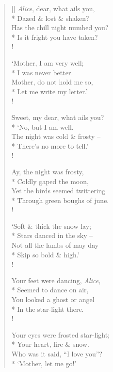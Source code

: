 \documentclass[MAIN]{subfiles}
\begin{document}
\settowidth{\versewidth}{\vin Is it fright you have taken?}
\begin{verse}[\versewidth]
\emph{Alice}, dear, what ails you,\\*
\vin Dazed \& lost \& shaken?\\
Has the chill night numbed you?\\*
\vin Is it fright you have taken?\\!

`Mother, I am very well;\\*
\vin I was never better.\\
Mother, do not hold me so,\\*
\vin Let me write my letter.'\\!

Sweet, my dear, what ails you?\\*
\vin `No, but I am well.\\
The night was cold \& frosty --\\*
\vin There's no more to tell.'\\!

Ay, the night was frosty,\\*
\vin Coldly gaped the moon,\\
Yet the birds seemed twittering\\*
\vin Through green boughs of june.\\!

`Soft \& thick the snow lay;\\*
\vin Stars danced in the sky --\\
Not all the lambs of may-day\\*
\vin Skip so bold \& high.'\\!

Your feet were dancing, \emph{Alice},\\*
\vin Seemed to dance on air,\\
You looked a ghost or angel\\*
\vin In the star-light there.\\!

Your eyes were frosted star-light;\\*
\vin Your heart, fire \& snow.\\
Who was it said, ``I love you''?\\*
\vin `Mother, let me go!'
\end{verse}
\end{document}
